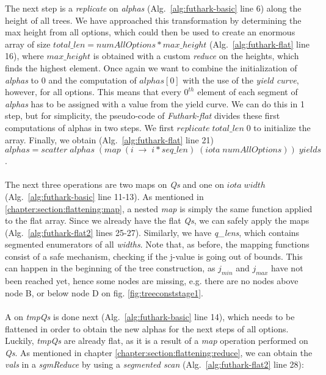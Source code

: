 The next step is a \textit{replicate} on \textit{alphas} (Alg.~\ref{alg:futhark-basic} line 6) along the height of all trees. We have approached this transformation by determining the max height from all options, which could then be used to create an enormous array of size $\mathit{total\_len}=\mathit{numAllOptions}*\mathit{max\_height}$ (Alg.~\ref{alg:futhark-flat} line 16), where $\mathit{max\_height}$ is obtained with a custom \textit{reduce} on the heights, which finds the highest element. Once again we want to combine the initialization of \textit{alphas} to $0$ and the computation of $\mathit{alphas}[0]$ with the use of the \textit{yield curve}, however, for all options. This means that every $0^{\mathit{th}}$ element of each segment of \textit{alphas} has to be assigned with a value from the yield curve. We can do this in 1 step, but for simplicity, the pseudo-code of \textit{Futhark-flat} divides these first computations of alphas in two steps. We first $\mathit{replicate}\;\mathit{total\_len}\;0$ to initialize the array. Finally, we obtain (Alg.~\ref{alg:futhark-flat} line 21)\\
$\mathit{alphas} = \mathit{scatter}\;\mathit{alphas}\;(\mathit{map}\;(i\;\rightarrow\;i*\mathit{seq\_len})\;(\mathit{iota}\;\mathit{numAllOptions}))\;\mathit{yields}$.
\\\\
The next three operations are two maps on \textit{Qs} and one on $\mathit{iota}\;\mathit{width}$ (Alg.~\ref{alg:futhark-basic} line 11-13). As mentioned in \ref{chapter:section:flattening:map}, a nested \textit{map} is simply the same function applied to the flat array. Since we already have the flat \textit{Qs}, we can safely apply the maps (Alg.~\ref{alg:futhark-flat2} lines 25-27). Similarly, we have \textit{q\_lens}, which contains segmented enumerators of all \textit{widths}. Note that, as before, the mapping functions consist of a safe mechanism, checking if the j-value is going out of bounds. This can happen in the beginning of the tree construction, as $j_{min}$ and $j_{max}$ have not been reached yet, hence some nodes are missing, e.g. there are no nodes above node B, or below node D on fig. \ref{fig:treeconststage1}.
\\\\
A  on \textit{tmpQs} is done next (Alg.~\ref{alg:futhark-basic} line 14), which needs to be flattened in order to obtain the new alphas for the next steps of all options. Luckily, \textit{tmpQs} are already flat, as it is a result of a \textit{map} operation performed on \textit{Qs}. As mentioned in chapter \ref{chapter:section:flattening:reduce}, we can obtain the \textit{vals} in a \textit{sgmReduce} by using a \textit{segmented scan} (Alg.~\ref{alg:futhark-flat2} line 28):
